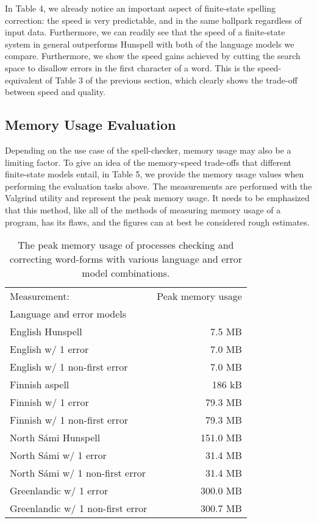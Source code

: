 \documentclass[postprint]{flammie}
\begin{document}
In Table 4, we already notice an important aspect of finite-state spelling
correction: the speed is very predictable, and in the same ballpark regardless
of input data. Furthermore, we can readily see that the speed of a
finite-state system in general outperforms Hunspell with both of the language
models we compare. Furthermore, we show the speed gains achieved by cutting the
search space to disallow errors in the first character of a word. This is the
speed-equivalent of Table 3 of the previous section, which clearly shows the
trade-off between speed and quality.

\subsection{Memory Usage Evaluation}

Depending on the use case of the spell-checker, memory usage may also be a
limiting factor. To give an idea of the memory-speed trade-offs that different
finite-state models entail, in Table 5, we provide the memory usage values
when performing the evaluation tasks above. The measurements are performed
with the Valgrind utility and represent the peak memory usage. It needs to be
emphasized that this method, like all of the methods of measuring memory usage
of a program, has its flaws, and the figures can at best be considered rough
estimates.

\begin{table}
    \caption{The peak memory usage of processes checking and correcting word-forms with various language and error model combinations.}
    \begin{tabular}{lr}
Measurement: & Peak memory usage \\
Language and error models & \\
        English Hunspell & 7.5 MB \\
        English w/ 1 error & 7.0 MB \\
        English w/ 1 non-first error & 7.0 MB \\
        Finnish aspell & 186 kB \\
        Finnish w/ 1 error & 79.3 MB \\
        Finnish w/ 1 non-first error & 79.3 MB \\
        North Sámi Hunspell & 151.0 MB \\
        North Sámi w/ 1 error & 31.4 MB \\
        North Sámi w/ 1 non-first error & 31.4 MB \\
        Greenlandic w/ 1 error & 300.0 MB \\
        Greenlandic w/ 1 non-first error & 300.7 MB \\
    \end{tabular}
\end{table}
\end{document}

